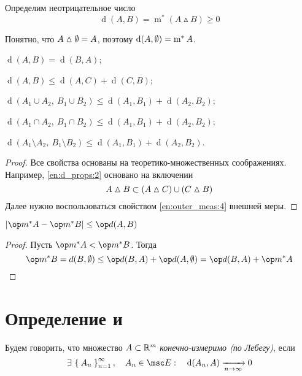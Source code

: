 Определим неотрицательное число
$$ \operatorname d(A, B) = \operatorname m^* (A \vartriangle B) \ge 0 $$

Понятно, что $ A \vartriangle \emptyset = A $, поэтому $ \operatorname d(A, \emptyset) = \operatorname m^* A $.

\begin{props}
	\item $ \operatorname d(A, B) = \operatorname d(B, A) $;
	\item \label{en:d_props:2} $ \operatorname d(A, B) \le \operatorname d(A, C) + \operatorname d(C, B) $;
	\item $ \operatorname d(A_1 \cup A_2, ~ B_1 \cup B_2) \le \operatorname d(A_1, B_1) + \operatorname d(A_2, B_2) $;
	\item $ \operatorname d(A_1 \cap A_2, ~ B_1 \cap B_2) \le \operatorname d(A_1, B_1) + \operatorname d(A_2, B_2) $;
	\item $ \operatorname d(A_1 \setminus A_2, ~ B_1 \setminus B_2) \le \operatorname d(A_1, B_1) + \operatorname d(A_2, B_2) $.
\end{props}

\begin{proof}
	Все свойства основаны на теоретико-множественных соображениях. Например, \ref{en:d_props:2} основано на включении
	$$ A \vartriangle B \subset (A \vartriangle C) \cup (C \vartriangle B) $$
	Далее нужно воспользоваться свойством \ref{en:outer_meas:4} внешней меры.
\end{proof}

\begin{statement}
	$ |\op m^* A - \op m^* B| \le \op d(A, B) $
\end{statement}

\begin{proof}
	Пусть $ \op m^* A < \op m^* B $. Тогда
	$$ \op m^* B = d(B, \O) \le \op d(B, A) + \op d(A, \O) = \op d(B, A) + \op m^* A $$
\end{proof}

\section{Определение  и }

\begin{definition}
	Будем говорить, что множество $ A \subset \mathbb{R}^m $ \emph{конечно-измеримо (по Лебегу)}, если
	$$ \exist \set{A_n}_{n = 1}^\infty, \quad A_n \in \msc E : \quad \operatorname d(A_n, A) \underarr{n \to \infty} 0 $$
\end{definition}

